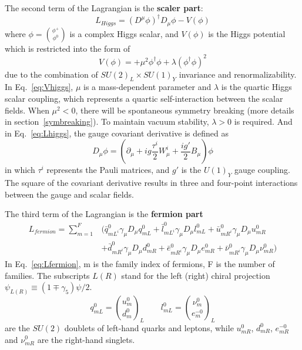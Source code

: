 The second term of the Lagrangian is the \textbf{scaler part}:
\begin{equation} \label{eq:Lhiggs}
	{L}_{Higgs} = \left(D^{\mu}\phi\right)^{\dagger}D_{\mu}\phi - V(\phi)
\end{equation}
where $\phi = \binom{\phi^{+}}{\phi^{0}}$  is a complex Higgs scalar,
and $V(\phi)$ is the Higgs potential which is restricted into the form of 
\begin{equation} \label{eq:Vhiggs}
	V(\phi) = +\mu^{2}\phi^{\dagger}\phi + \lambda\left(\phi^{\dagger}\phi\right)^{2}
\end{equation}
due to the combination of $SU(2)_{L} \times SU(1)_{Y}$ invariance and renormalizability.
In Eq.~\ref{eq:Vhiggs}, $\mu$ is a mass-dependent parameter and $\lambda$ is the quartic Higgs scalar coupling, 
which represents a quartic self-interaction between the scalar fields.
When $\mu^{2} < 0$, there will be spontaneous symmetry breaking (more details in section~\ref{symbreaking}).
To maintain vacuum stability, $\lambda > 0$ is required.
And in Eq.~\ref{eq:Lhiggs}, the gauge covariant derivative is defined as
\begin{equation}
	D_{\mu}\phi = \left(\partial_{\mu} +ig\frac{\tau^{i}}{2}W_{\mu}^{i} + \frac{ig'}{2}B_{\mu}\right)\phi
\end{equation}
in which $\tau^{i}$ represents the Pauli matrices, and $g'$ is the $U(1)_{Y}$ gauge coupling.
The square of the covariant derivative results in three and four-point interactions between the gauge and scalar fields.

The third term of the Lagrangian is the \textbf{fermion part}
\begin{equation} \label{eq:Lfermion}
\begin{split}
  	{L}_{fermion} = \sum_{m=1}^{F} & ( \bar{q}_{mL^{i}}^{0}\gamma_{\mu}D_{\mu}q_{mL}^{0} + \bar{l}_{mL^{i}}^{0}\gamma_{\mu}D_{\mu}l_{mL}^{0} + \bar{u}_{mR^{i}}^{0}\gamma_{\mu}D_{\mu}u_{mR}^{0} \\
  	& + \bar{d}_{mR^{i}}^{0}\gamma_{\mu}D_{\mu}d_{mR}^{0} + \bar{e}_{mR^{i}}^{0}\gamma_{\mu}D_{\mu}e_{mR}^{0} + \bar{\nu}_{mR^{i}}^{0}\gamma_{\mu}D_{\mu}\nu_{mR}^{0})
\end{split}
\end{equation} 
In Eq.~\ref{eq:Lfermion}, m is the family index of fermions, F is the number of families.
The subscripts $L (R)$ stand for the left (right) chiral projection $\psi_{L(R)} \equiv \left(1 \mp \gamma_{5} \right) \psi/2$.
\begin{equation}
	q_{mL}^{0} = \binom{u_{m}^{0}}{d_{m}^{0}}_{L}   \qquad    l_{mL}^{0} = \binom{\nu_{m}^{0}}{e_{m}^{-0}}_{L}
\end{equation}
are the $SU(2)$ doublets of left-hand quarks and leptons, while 
$u_{mR}^{0}$, $d_{mR}^{0}$, $e_{mR}^{-0}$ and $\nu_{mR}^{0}$ are the right-hand singlets.

